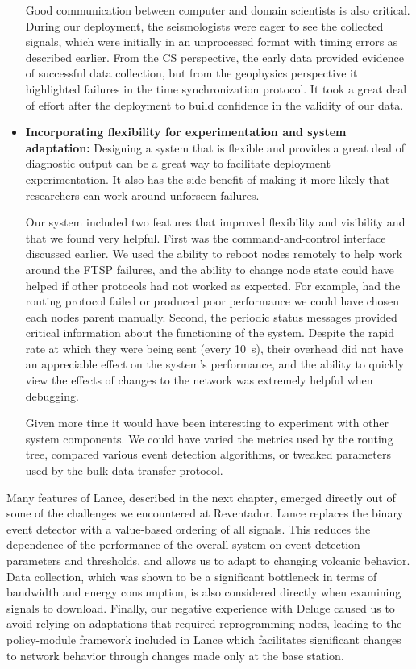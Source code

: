 \begin{itemize}
Good communication between computer and domain scientists is also critical.
During our deployment, the seismologists were eager to see the collected
signals, which were initially in an unprocessed format with timing errors as
described earlier. From the CS perspective, the early data provided evidence
of successful data collection, but from the geophysics perspective it
highlighted failures in the time synchronization protocol. It took a great
deal of effort after the deployment to build confidence in the validity of
our data.

\item \textbf{Incorporating flexibility for experimentation and system
adaptation:} Designing a system that is flexible and provides a great deal of
diagnostic output can be a great way to facilitate deployment
experimentation. It also has the side benefit of making it more likely that
researchers can work around unforseen failures.

Our system included two features that improved flexibility and visibility and
that we found very helpful. First was the command-and-control interface
discussed earlier. We used the ability to reboot nodes remotely to help work
around the FTSP failures, and the ability to change node state could have
helped if other protocols had not worked as expected. For example, had the
routing protocol failed or produced poor performance we could have chosen
each nodes parent manually. Second, the periodic status messages provided
critical information about the functioning of the system. Despite the rapid
rate at which they were being sent (every 10~s), their overhead did not have
an appreciable effect on the system's performance, and the ability to quickly
view the effects of changes to the network was extremely helpful when
debugging.

Given more time it would have been interesting to experiment with other
system components. We could have varied the metrics used by the routing tree,
compared various event detection algorithms, or tweaked parameters used by
the bulk data-transfer protocol.

\end{itemize}

Many features of Lance, described in the next chapter, emerged directly out
of some of the challenges we encountered at Reventador. Lance replaces the
binary event detector with a value-based ordering of all signals. This
reduces the dependence of the performance of the overall system on event
detection parameters and thresholds, and allows us to adapt to changing
volcanic behavior. Data collection, which was shown to be a significant
bottleneck in terms of bandwidth and energy consumption, is also considered
directly when examining signals to download. Finally, our negative experience
with Deluge caused us to avoid relying on adaptations that required
reprogramming nodes, leading to the policy-module framework included in Lance
which facilitates significant changes to network behavior through changes
made only at the base station.

